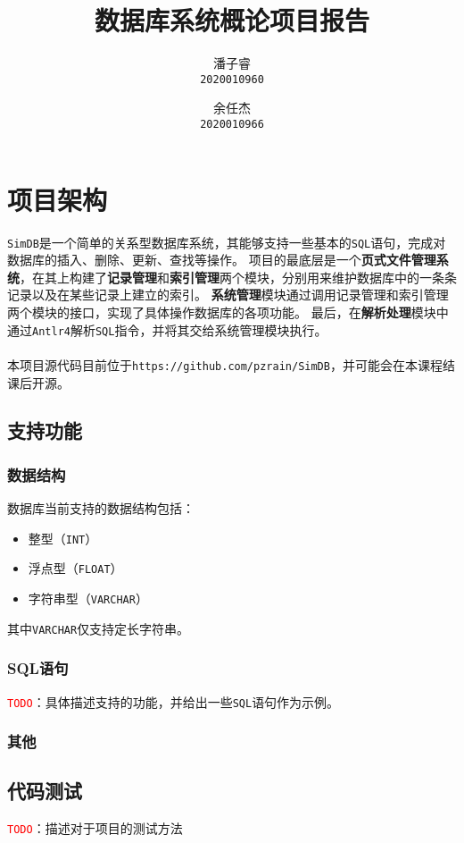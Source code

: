 \documentclass[11pt]{article}
\title{\textbf{数据库系统概论项目报告}}
\author{
    潘子睿\\
    \texttt{2020010960}
    \and
    余任杰\\
    \texttt{2020010966}
}
\begin{document}
\maketitle
\tableofcontents
\setlength{\parindent}{0pt}
\clearpage

\section{项目架构}
\texttt{SimDB}是一个简单的关系型数据库系统，其能够支持一些基本的\texttt{SQL}语句，完成对数据库的插入、删除、更新、查找等操作。
项目的最底层是一个\textbf{页式文件管理系统}，在其上构建了\textbf{记录管理}和\textbf{索引管理}两个模块，分别用来维护数据库中的一条条记录以及在某些记录上建立的索引。
\textbf{系统管理}模块通过调用记录管理和索引管理两个模块的接口，实现了具体操作数据库的各项功能。
最后，在\textbf{解析处理}模块中通过\texttt{Antlr4}解析\texttt{SQL}指令，并将其交给系统管理模块执行。\\\\
本项目源代码目前位于\texttt{https://github.com/pzrain/SimDB}，并可能会在本课程结课后开源。
\subsection{支持功能}
\subsubsection{数据结构}
数据库当前支持的数据结构包括：
\begin{itemize}
    \item 整型（\texttt{INT}）
    \item 浮点型（\texttt{FLOAT}）
    \item 字符串型（\texttt{VARCHAR}）
\end{itemize}
其中\texttt{VARCHAR}仅支持定长字符串。
\subsubsection{SQL语句}
\texttt{\textcolor{red}{TODO}}：具体描述支持的功能，并给出一些\texttt{SQL}语句作为示例。
\subsubsection{其他}
\subsection{代码测试}
\texttt{\textcolor{red}{TODO}}：描述对于项目的测试方法
\end{document}
